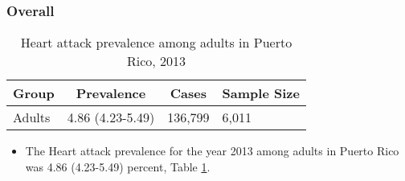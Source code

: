 
\subsubsection{Overall}




\begin{table}[H]
\caption{Heart attack prevalence among adults in Puerto Rico, 2013\label{tab:Overall.tabl.Heart_Attack.2013}} 
\begin{center}
\begin{tabular}{llll}
\hline\hline
\multicolumn{1}{l}{Group}&\multicolumn{1}{c}{Prevalence}&\multicolumn{1}{c}{Cases}&\multicolumn{1}{c}{Sample Size}\tabularnewline
\hline
Adults&4.86 (4.23-5.49)&136,799&6,011\tabularnewline
\hline
\end{tabular}\end{center}

\end{table}




\begin{itemize}


\item The Heart attack prevalence for the year 2013 among adults in Puerto Rico was 4.86 (4.23-5.49) percent, 
Table \ref{tab:Overall.tabl.Heart_Attack.2013}.

\end{itemize}



